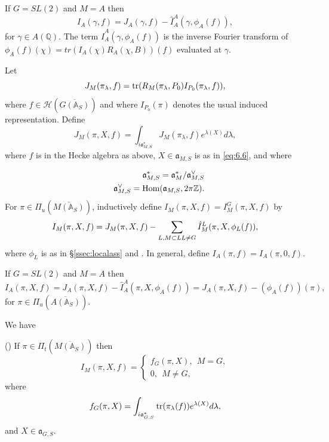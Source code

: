 \begin{example}\label{ex:6.18}
If $G=SL(2)$ and $M=A$ then
\[
I_A(\gamma,f)
=J_A(\gamma,f)-
\hat{I}_A^A(\gamma,\phi_A(f)),
\]
for $\gamma\in A({\mathbb{Q}})$.
The term $\hat{I}_A^A(\gamma,\phi_A(f))$
is the inverse Fourier transform of
$\phi_A(f)(\chi)=tr(I_A(\chi)R_A(\chi,B))(f)$ evaluated at
$\gamma$. 
\end{example}

Let
\begin{equation}\label{eq:6.21}
J_M(\pi_\lambda,f)=
{\rm tr}(R_M(\pi_\lambda,P_0)
I_{P_0}(\pi_\lambda,f)),
\end{equation}
where $f\in {\mathcal{H}}(\overline{G({\mathbb{A}}_S)})$ and where
$I_{P_0}(\pi)$ denotes the usual induced representation.
Define
\begin{equation}\label{eq:6.22}
J_M(\pi,X,f)
=\int_{i{\mathfrak{a}}^*_{M,S}}
J_M(\pi_\lambda,f)e^{\lambda(X)}d\lambda,
\end{equation}
where $f$ is in the Hecke algebra as above, $X\in {\mathfrak{a}}_{M,S}$
is as in \eqref{eq:6.6}, and where

\begin{eqnarray*}
&&{\mathfrak{a}}^*_{M,S}
={\mathfrak{a}}^*_{M}/{\mathfrak{a}}^{\vee}_{M,S}\\
&&{\mathfrak{a}}^{\vee}_{M,S}={\rm Hom}({\mathfrak{a}}_{M,S},2\pi {\mathbb Z}).
\end{eqnarray*}
For
$\pi\in \Pi_u(\overline{M({\mathbb{A}}_S)})$,
inductively define $I_M(\pi,X,f)=I_M^G(\pi,X,f)$ by
\begin{equation}\label{eq:6.23}
I_M(\pi,X,f)
=J_M(\pi,X,f)-
\sum_{ L, M\subset L\\ L\not= G}
\hat{I}_M^L(\pi,X,\phi_L(f)),
\end{equation}
where $\phi_L$ is as in \S\ref{ssec:localass} and \cite[section 3]{A9}.
In general, define $I_A(\pi,f)=I_A(\pi,0,f)$.

\begin{example}\label{ex:6.19}
If $G=SL(2)$ and $M=A$ then
\[
I_A(\pi,X,f)
=J_A(\pi,X,f)-
\hat{I}_A^A(\pi,X,\phi_A(f))
=J_A(\pi,X,f)-(\phi_A(f))(\pi),
\]
for $\pi\in \Pi_u(\overline{A({\mathbb{A}}_S)})$.
\end{example}

We have

\begin{proposition}\label{prop:6.20}
(\cite[Lemma 3.1]{A9}) If $\pi\in\Pi_t(\overline{M({\mathbb{A}}_S)})$ then
\[
I_M(\pi,X,f)=
\left\{
\begin{array}{c}
 f_G(\pi,X),\ \ M=G,\\
 0,\ \ M\not= G,
\end{array}
\right.
\]
where
\[
f_G(\pi,X)=
\int_{i{\mathfrak{a}}^*_{G,S}}
{\rm tr}(\pi_\lambda(f))e^{\lambda(X)}d\lambda,
\]
and $X\in {\mathfrak{a}}_{G,S}$.
\end{proposition}

